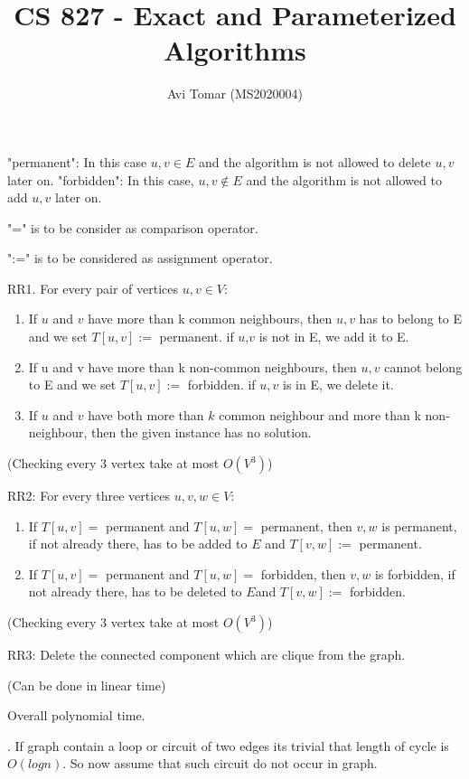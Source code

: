 \documentclass{homeworg}
\title{CS 827 - Exact and Parameterized Algorithms}
\author{Avi Tomar (MS2020004)}
\begin{document}
\maketitle

\exercise
"permanent": In this case ${u,v} \in E$ and the algorithm is not allowed to delete ${u,v}$ later on.
"forbidden": In this case, ${u,v} \notin E$ and the algorithm is not allowed to add ${u,v}$ later on.

"=" is to be consider as comparison operator.

":=" is to be considered as assignment operator.

RR1. For every pair of vertices $u,v \in V$:

\begin{enumerate}
    \item If $u$ and $v$ have more than k common neighbours, then ${u,v}$ has to belong to E and we set $T[u,v]:=$ permanent. if {$u$,$v$} is not in E, we add it to E.
    \item If u and v have more than k non-common neighbours, then ${u,v}$ cannot belong to E and we set $T[u,v]:=$ forbidden. if ${u,v}$ is in E, we delete it.
    \item If $u$ and $v$ have both more than $k$ common neighbour and more than k non-neighbour, then the given instance has no solution.
\end{enumerate}
(Checking every 3 vertex take at most $O(V^3)$)


RR2: For every three vertices $u,v,w \in V$:

\begin{enumerate}
    \item If $T[u,v]=$ permanent and $T[u,w]=$ permanent, then ${v,w}$ is permanent, if not already there, has to be added to $E$ and $T[v,w]:=$ permanent.
    \item If $T[u,v]=$ permanent and $T[u,w]=$ forbidden, then ${v,w}$ is forbidden, if not already there, has to be deleted to $E$and $T[v,w]:=$ forbidden.
\end{enumerate}

(Checking every 3 vertex take at most $O(V^3)$)

RR3: Delete the connected component which are clique from the graph. 

(Can be done in linear time)

Overall polynomial time.





. 
If graph contain a loop or circuit of two edges its trivial that length of cycle is $O(logn)$.
So now assume that such circuit do not occur in graph. 
\end{document}
